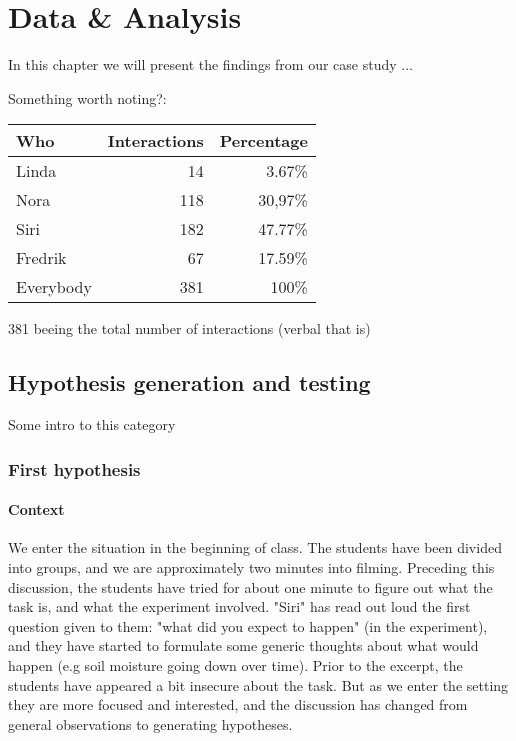 \chapter{Data \& Analysis}
In this chapter we will present the findings from our case study ...

Something worth noting?:
\begin{table}[H]
\begin{center}
	\begin{tabular}{l r r } \toprule
	Who &  Interactions  & Percentage\\ \midrule  
	Linda &	 14  & 3.67\% \\
	Nora&	118 & 30,97\% \\ 
	Siri& 	182 & 47.77\% \\
	Fredrik& 67 & 17.59\% \\ \midrule
	Everybody &	381 & 100\%\\
	\bottomrule
	\end{tabular}
\end{center}
\end{table}
381 beeing the total number of interactions (verbal that is)



\section{Hypothesis generation and testing}
Some intro to this category
\subsection{First hypothesis}
\subsubsection*{Context}
\label{firsthypothesis}
We enter the situation in the beginning of class. The students have been divided into groups, and we are approximately two minutes into filming. Preceding this discussion, the students have tried for about one minute to figure out what the task is, and what the experiment involved. "Siri" has read out loud the first question given to them: "what did you expect to happen" (in the experiment), and they have started to formulate some generic thoughts about what would happen (e.g soil moisture going down over time). Prior to the excerpt, the students have appeared a bit insecure about the task. But as we enter the setting they are more focused and interested, and the discussion has changed from general observations to generating hypotheses.

